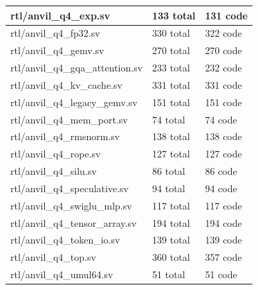 \documentclass[11pt,a4paper]{article}
\begin{document}
{\begin{longtable}{@{}L{0.55\textwidth}|L{0.18\textwidth}|L{0.18\textwidth}@{}}
rtl/\allowbreak{}anvil\_\allowbreak{}q4\_\allowbreak{}exp.sv & 133 total & 131 code\\[2pt]\hline

rtl/\allowbreak{}anvil\_\allowbreak{}q4\_\allowbreak{}fp32.sv & 330 total & 322 code\\[2pt]\hline

rtl/\allowbreak{}anvil\_\allowbreak{}q4\_\allowbreak{}gemv.sv & 270 total & 270 code\\[2pt]\hline

rtl/\allowbreak{}anvil\_\allowbreak{}q4\_\allowbreak{}gqa\_\allowbreak{}attention.sv & 233 total & 232 code\\[2pt]\hline

rtl/\allowbreak{}anvil\_\allowbreak{}q4\_\allowbreak{}kv\_\allowbreak{}cache.sv & 331 total & 331 code\\[2pt]\hline

rtl/\allowbreak{}anvil\_\allowbreak{}q4\_\allowbreak{}legacy\_\allowbreak{}gemv.sv & 151 total & 151 code\\[2pt]\hline

rtl/\allowbreak{}anvil\_\allowbreak{}q4\_\allowbreak{}mem\_\allowbreak{}port.sv & 74 total & 74 code\\[2pt]\hline

rtl/\allowbreak{}anvil\_\allowbreak{}q4\_\allowbreak{}rmsnorm.sv & 138 total & 138 code\\[2pt]\hline

rtl/\allowbreak{}anvil\_\allowbreak{}q4\_\allowbreak{}rope.sv & 127 total & 127 code\\[2pt]\hline

rtl/\allowbreak{}anvil\_\allowbreak{}q4\_\allowbreak{}silu.sv & 86 total & 86 code\\[2pt]\hline

rtl/\allowbreak{}anvil\_\allowbreak{}q4\_\allowbreak{}speculative.sv & 94 total & 94 code\\[2pt]\hline

rtl/\allowbreak{}anvil\_\allowbreak{}q4\_\allowbreak{}swiglu\_\allowbreak{}mlp.sv & 117 total & 117 code\\[2pt]\hline

rtl/\allowbreak{}anvil\_\allowbreak{}q4\_\allowbreak{}tensor\_\allowbreak{}array.sv & 194 total & 194 code\\[2pt]\hline

rtl/\allowbreak{}anvil\_\allowbreak{}q4\_\allowbreak{}token\_\allowbreak{}io.sv & 139 total & 139 code\\[2pt]\hline

rtl/\allowbreak{}anvil\_\allowbreak{}q4\_\allowbreak{}top.sv & 360 total & 357 code\\[2pt]\hline

rtl/\allowbreak{}anvil\_\allowbreak{}q4\_\allowbreak{}umul64.sv & 51 total & 51 code\\[2pt]\hline

\bottomrule\end{longtable}}
\end{document}

